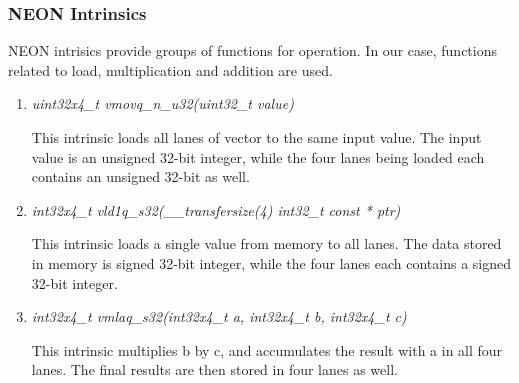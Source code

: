 \subsubsection{NEON Intrinsics}
NEON intrisics provide groups of functions for operation. 
In our case, functions related to load, multiplication and addition are used. 
\begin{enumerate}
\item \emph{uint32x4\_t  vmovq\_n\_u32(uint32\_t value)}

This intrinsic loads all lanes of vector to the same input value. 
The input value is an unsigned 32-bit integer, 
while the four lanes being loaded each contains an unsigned 32-bit as well.


\item \emph{int32x4\_t   vld1q\_s32(\_\_transfersize(4) int32\_t const * ptr)}

This intrinsic loads a single value from memory to all lanes.
The data stored in memory is signed 32-bit integer, 
while the four lanes each contains a signed 32-bit integer.

\item \emph{int32x4\_t   vmlaq\_s32(int32x4\_t a, int32x4\_t b, int32x4\_t c)}

This intrinsic multiplies b by c, and accumulates the result with a in all four lanes.
The final results are then stored in four lanes as well.
\end{enumerate}
